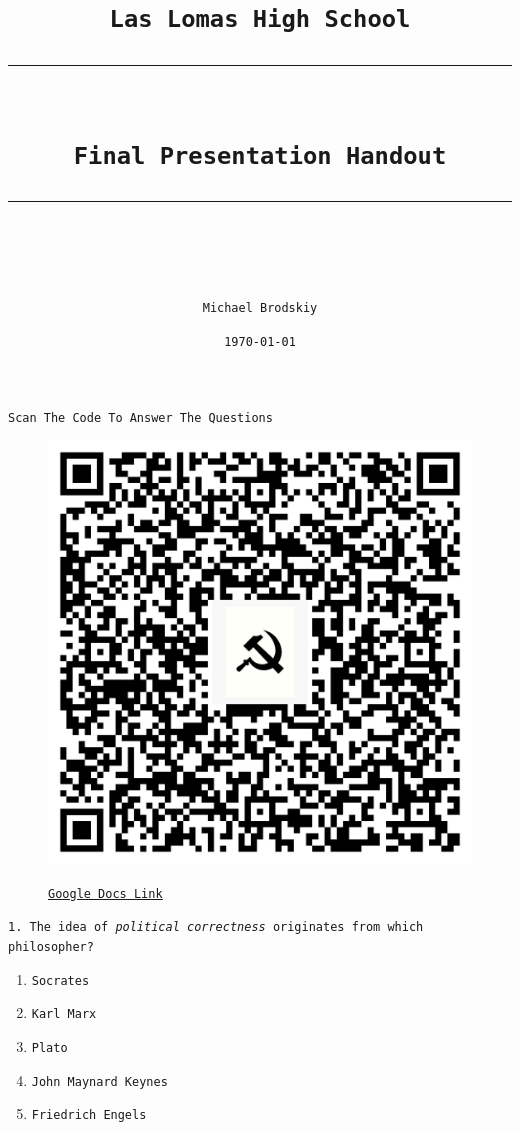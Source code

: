 \documentclass[11pt]{scrartcl} %
\title{	
	\normalfont\normalsize
	\texttt{Las Lomas High School}\\ %
	\vspace{25pt} %
	\rule{\linewidth}{0.5pt}\\ %
	\vspace{20pt} %
	{\huge \texttt{Final Presentation Handout}}\\ %
	\vspace{12pt} %
	\rule{\linewidth}{2pt}\\ %
	\vspace{12pt} %
}
\author{\texttt{Michael Brodskiy}} %
\date{\normalsize \texttt{\today}} %
\begin{document}
\maketitle %


\begin{center} \Large \texttt{Scan The Code To Answer The Questions}\end{center}

\begin{figure}[h] %
	\centering
	\includegraphics[width=0.25\columnwidth]{qr-code.png} %
	\begin{center}\href{https://docs.google.com/forms/d/e/1FAIpQLSfYMmx2X6UYP7ulLeHvN58Za3fsqA_Lk6Ko57OAVElkdP2epw/viewform?usp=sf_link}{\underline{\texttt{Google Docs Link}}}\end{center}
\end{figure}



\texttt{1. The idea of \textit{political correctness} originates from which philosopher?}

\begin{enumerate}[label=\texttt{\textbf{\alph*)}}]
\item \texttt{Socrates}
\item \texttt{Karl Marx}
\item \texttt{Plato}
\item \texttt{John Maynard Keynes}
\item \texttt{Friedrich Engels}
\end{enumerate}


\end{document}
